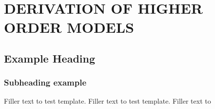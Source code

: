 
\chapter{DERIVATION OF HIGHER ORDER MODELS}

\section{Example Heading}

\subsection{Subheading example}

Filler text to test template. Filler text to test template. Filler text to


